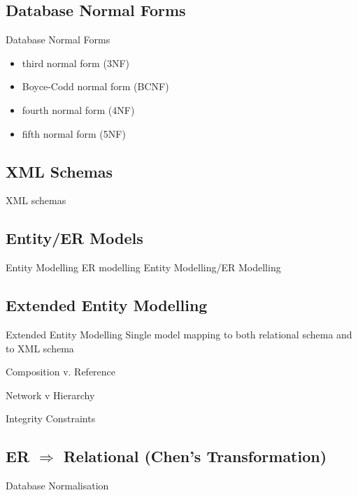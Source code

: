 \documentclass{beamer}
\begin{document}
\subsection{Database Normal Forms}
\begin{frame}{Database Normal Forms}
\begin{itemize}
\item third normal form (3NF)
\item Boyce-Codd normal form (BCNF)
\item fourth normal form (4NF)
\item fifth normal form (5NF)
\end{itemize}
\end{frame}

\subsection{XML Schemas}
\begin{frame}{XML schemas}
\end{frame}

\subsection{Entity/ER Models}
\begin{frame}{Entity Modelling ER modelling}
Entity Modelling/ER Modelling
\end{frame}
\subsection{Extended Entity Modelling}

\begin{frame}{Extended Entity Modelling}
Single model mapping to both relational schema and to XML schema
\end{frame}
\begin{frame}{Composition v. Reference}
\end{frame}
\begin{frame}{Network v Hierarchy}
\end{frame}
\begin{frame}{Integrity Constraints}
\end{frame}
\subsection{ER $\Longrightarrow$ Relational (Chen's Transformation)}
\begin{frame}
\end{frame}
\begin{frame}{Database Normalisation}
\end{frame}
\end{document}
